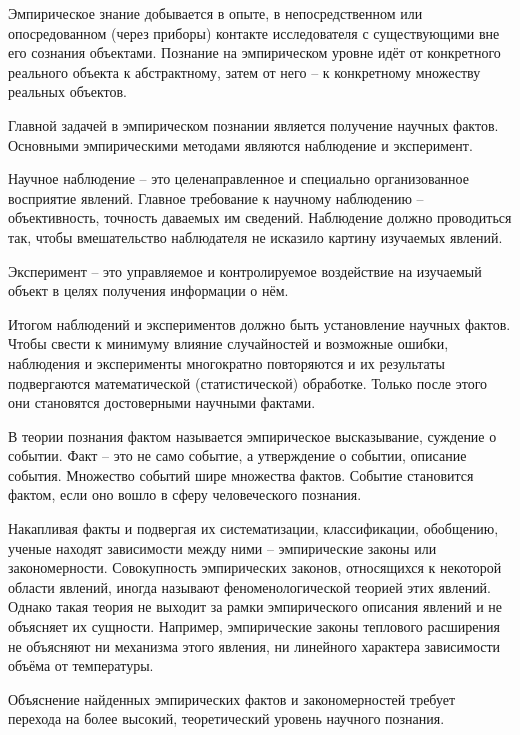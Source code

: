 \documentclass[exam_answers.tex]{subfiles}
\begin{document}
\renewcommand{\baselinestretch}{\blch}

Эмпирическое знание добывается в опыте, в непосредственном или опосредованном (через приборы) контакте исследователя с существующими вне его сознания объектами.
Познание на эмпирическом уровне идёт от конкретного реального объекта к абстрактному, затем от него – к конкретному множеству реальных объектов.

Главной задачей в эмпирическом познании является получение научных фактов.
Основными эмпирическими методами являются наблюдение и эксперимент.

Научное наблюдение – это целенаправленное и специально организованное восприятие явлений.
Главное требование к научному наблюдению – объективность, точность даваемых им сведений.
Наблюдение должно проводиться так, чтобы вмешательство наблюдателя не исказило картину изучаемых явлений.

Эксперимент – это управляемое и контролируемое воздействие на изучаемый объект в целях получения информации о нём.

Итогом наблюдений и экспериментов должно быть установление научных фактов.
Чтобы свести к минимуму влияние случайностей и возможные ошибки, наблюдения и эксперименты многократно повторяются и их результаты подвергаются математической (статистической) обработке.
Только после этого они становятся достоверными научными фактами.

В теории познания фактом называется эмпирическое высказывание, суждение о событии. 
Факт – это не само событие, а утверждение о событии, описание события.
Множество событий шире множества фактов.
Событие становится фактом, если оно вошло в сферу человеческого познания.

Накапливая факты и подвергая их систематизации, классификации, обобщению, ученые находят зависимости между ними – эмпирические законы или закономерности.
Совокупность эмпирических законов, относящихся к некоторой области явлений, иногда называют феноменологической теорией этих явлений.
Однако такая теория не выходит за рамки эмпирического описания явлений и не объясняет их сущности.
Например, эмпирические законы теплового расширения не объясняют ни механизма этого явления, ни линейного характера зависимости объёма от температуры.

Объяснение найденных эмпирических фактов и закономерностей требует перехода на более высокий, теоретический уровень научного познания.
\end{document}

